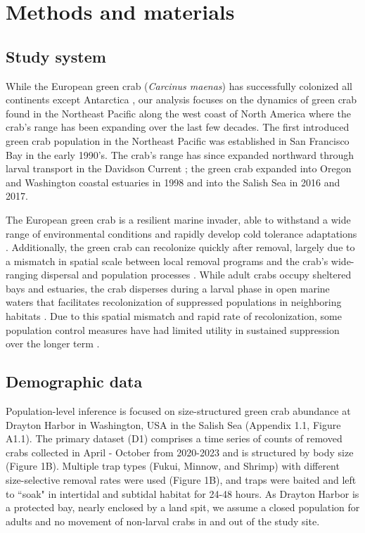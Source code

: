 \documentclass{article}
\begin{document}
\section{Methods and materials}

\subsection{Study system}

While the European green crab (\textit{Carcinus maenas}) has successfully colonized all continents except Antarctica \parencite{yamada2001global}, our analysis focuses on the dynamics of green crab found in the Northeast Pacific along the west coast of North America where the crab's range has been expanding over the last few decades. The first introduced green crab population in the Northeast Pacific was established in San Francisco Bay in the early 1990's. The crab's range has since expanded northward through larval transport in the Davidson Current \parencite{yamada2021ocean}; the green crab expanded into Oregon and Washington coastal estuaries in 1998 and into the Salish Sea in 2016 and 2017. 

The European green crab is a resilient marine invader, able to withstand a wide range of environmental conditions and rapidly develop cold tolerance adaptations \parencite{tepolt2020rapid}. Additionally, the green crab can recolonize quickly after removal, largely due to a mismatch in spatial scale between local removal programs and the crab’s wide-ranging dispersal and population processes \parencite{keller2025transition}. While adult crabs occupy sheltered bays and estuaries, the crab disperses during a larval phase in open marine waters that facilitates recolonization of suppressed populations in neighboring habitats \parencite{yamada2021ocean}. Due to this spatial mismatch and rapid rate of recolonization, some population control measures have had limited utility in sustained suppression over the longer term \parencite{tummon2024rebound, duncombe2015evaluating}. 

\subsection{Demographic data}

Population-level inference is focused on size-structured green crab abundance at Drayton Harbor in Washington, USA in the Salish Sea (Appendix 1.1, Figure A1.1). The primary dataset (D1) comprises a time series of counts of removed crabs collected in April - October from 2020-2023 and is structured by body size (Figure 1B). Multiple trap types (Fukui, Minnow, and Shrimp) with different size-selective removal rates were used (Figure 1B), and traps were baited and left to ``soak" in intertidal and subtidal habitat for 24-48 hours. As Drayton Harbor is a protected bay, nearly enclosed by a land spit, we assume a closed population for adults and no movement of non-larval crabs in and out of the study site. 
\end{document}
